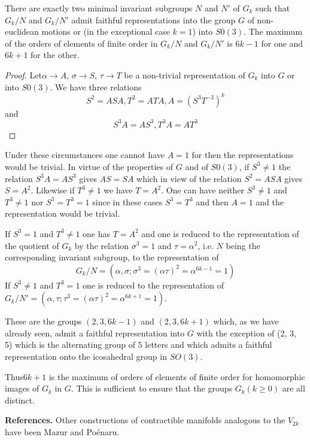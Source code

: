 \begin{prop*}
There are exactly two minimal invariant subgroups $N$ and $N'$ of
  $G_k$ such that $G_k / N$ and $G_k / N'$ admit faithful
  representations into the group $G$ of non-euclidean motions or (in
  the exceptional case $k = 1$) into $S0 (3)$. The maximum of the
  orders of elements of finite order in $G_k / N$ and $G_k / N'$ is
  $6k -1$ for one and $6k +1$ for the other. 
\end{prop*}

\begin{proof}
Let\pageoriginale $\alpha \to A$, $\sigma \to S$, $\tau \to T$ be a
non-trivial representation of $G_k$ into $G$ or into $S0(3)$. We have
three relations   
$$
S^2 = ASA, T^2 = ATA, A = (S^3 T^{-3})^k
$$
and 
$$
S^3 A = AS^3, T^3 A = AT^3
$$
\end{proof}

Under these circumstances one cannot have $A = 1$ for then the
representations would be trivial. In virtue of the properties of $G$
and of $S0(3)$, if $S^3 \neq 1$ the relation $S^3 A = AS^3$ gives $AS
= SA$ which in view of the relation $S^2 = ASA$ gives $S =
A^2$. Likewise if $T^3 \neq 1$ we have $T = A^2$. One can have neither
$S^3 \neq 1$ and $T^3 \neq 1$ nor $S^3 = T^3 =1$ since in these cases
$S^3 = T^3$ and then $A=1$ and the representation would be trivial. 

If $S^3 = 1$ and $T^3 \neq 1$ one has $T = A^2$ and one is reduced to
the representation of the quotient of $G_k$ by the relation $\sigma^3
=1$ and $\tau = \alpha^2$, i.e. $N$ being the corresponding invariant
subgroup, to the representation of  
$$
G_k / N = (\alpha, \sigma; \sigma^3 = (\alpha \tau)^2 = \alpha^{6k-1} =1)
$$
If $S^3 \neq 1$ and $T^3 = 1$ one is reduced to the representation of
$G_k /N' = (\alpha, \tau ; \tau^3 = (\alpha \tau)^2 = \alpha ^{6k +1}
=1)$. 

These are the groups $(2,3,6k -1)$ and $(2,3,6k+1)$ which, as we have
already seen, admit a faithful representation into $G$ with the
exception of (2, 3, 5) which is the alternating group of 5 letters
and which admits a faithful representation onto the icosahedral group
in $SO(3)$. 

Thus\pageoriginale $6k +1$ is the maximum of orders of elements of
finite order for homomorphic images of $G_k$ in $G$. This is
sufficient to ensure that the groups $G_k (k \geq 0)$ are all
distinct.  

\medskip
\noindent
\textbf{References.} Other constructions of contractible manifolds
analogous to the $V_{2k}$ have been Mazur and Po\'enaru. 

